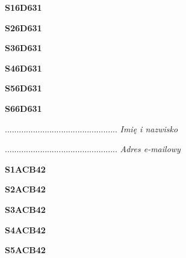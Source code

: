 \begin{turn}{90}\huge \textbf{S16D631}\end{turn}

\begin{turn}{90}\huge \textbf{S26D631}\end{turn}

\begin{turn}{90}\huge \textbf{S36D631}\end{turn}

\begin{turn}{90}\huge \textbf{S46D631}\end{turn}

\begin{turn}{90}\huge \textbf{S56D631}\end{turn}

\begin{turn}{90}\huge \textbf{S66D631}\end{turn}

\begin{turn}{90}\begin{minipage}{\linewidth} \vspace{20mm} ................................................  \textit{Imię i nazwisko}\end{minipage}\end{turn}

\begin{turn}{90}\begin{minipage}{\linewidth} \vspace{20mm} ................................................  \textit{Adres e-mailowy}\end{minipage}\end{turn}

\begin{turn}{90}\huge \textbf{S1ACB42}\end{turn}

\begin{turn}{90}\huge \textbf{S2ACB42}\end{turn}

\begin{turn}{90}\huge \textbf{S3ACB42}\end{turn}

\begin{turn}{90}\huge \textbf{S4ACB42}\end{turn}

\begin{turn}{90}\huge \textbf{S5ACB42}\end{turn}

